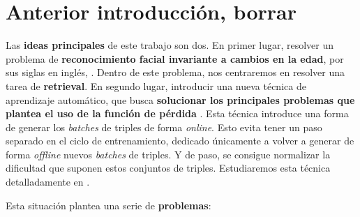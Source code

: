 \section{Anterior introducción, borrar}

Las \textbf{ideas principales} de este trabajo son dos. En primer lugar, resolver un problema de \textbf{reconocimiento facial invariante a cambios en la edad}, por sus siglas en inglés, . Dentro de este problema, nos centraremos en resolver una tarea de \textbf{retrieval}. En segundo lugar, introducir una nueva técnica de aprendizaje automático, que busca \textbf{solucionar los principales problemas que plantea el uso de la función de pérdida } \cite{informatica:principal}. Esta técnica introduce una forma de generar los \textit{batches} de triples de forma \textit{online}. Esto evita tener un paso separado en el ciclo de entrenamiento, dedicado únicamente a volver a generar de forma \textit{offline} nuevos \textit{batches} de triples. Y de paso, se consigue normalizar la dificultad que suponen estos conjuntos de triples. Estudiaremos esta técnica detalladamente en .

Esta situación plantea una serie de \textbf{problemas}:

